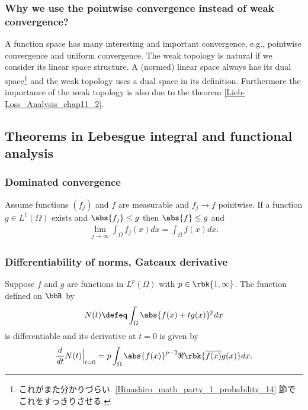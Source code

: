 \documentclass[openany, a4paper, oneside]{jsbook}
\begin{document}
\subsubsection{Why we use the pointwise convergence instead of weak convergence?}

A function space has many interesting and important convergence, e.g., pointwise convergence and uniform convergence.
The weak topology is natural if we consider its linear space structure.
A (normed) linear space always has its dual space\footnote{これがまた分かりづらい. \ref{Hinashiro_math_party_1_probability_14} 節でこれをすっきりさせる.} and the weak topology uses a dual space in its definition.
Furthermore the importance of the weak topology is also due to the theorem \ref{Lieb-Loss_Analysis_chap11_2}.
\subsection{Theorems in Lebesgue integral and functional analysis}

\subsubsection{Dominated convergence}

\begin{thm}\label{Lieb-Loss_Analysis_chap11_6}
 Assume functions $(f_j)$ and $f$ are measurable and $f_j \to f$ pointwise.
 If a function $g \in L^1 (\Omega)$ exists and $\abs{f_j} \leq g$ then $\abs{f} \leq g$ and
\begin{align}
 \lim_{j \to \infty} \int_{\Omega} f_j (x) dx
 =
 \int_{\Omega} f (x) dx.
\end{align}
\end{thm}
\subsubsection{Differentiability of norms, Gateaux derivative}

\begin{thm}\label{Lieb-Loss_Analysis_chap11_26}
 Suppose $f$ and $g$ are functions in $L^p (\Omega)$ with $p \in \rbk{1, \infty}$.
 The function defined on $\bbR$ by
\begin{align}
 N (t)
 \defeq
 \int_{\Omega} \abs{f (x) + t g (x)}^{p} dx
\end{align}
is differentiable and its derivative at $t = 0$ is given by
\begin{align}
 \frac{d}{dt} N (t) \Big |_{t=0}
 =
 p \int_{\Omega} \abs{f (x)}^{p-2} \Re \rbk{\overline{f (x)} g (x)} dx.
\end{align}
\end{thm}
\end{document}
